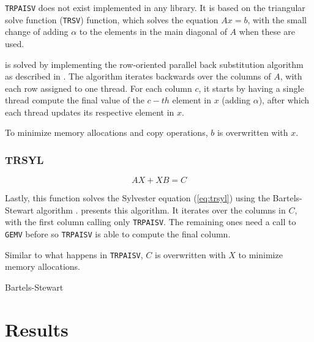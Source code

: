 \documentclass[../thesis]{subfiles}
\begin{document}
		\texttt{TRPAISV} does not exist implemented in any \blas library. It is based on the triangular solve function (\texttt{TRSV}) function, which solves the equation $Ax = b$, with the small change of adding $\alpha$ to the elements in the main diagonal of $A$ when these are used.

		 is solved by implementing the row-oriented parallel back substitution algorithm as described in \cite[293-295]{Quinn:PP:2003}. The algorithm iterates backwards over the columns of $A$, with each row assigned to one thread. For each column $c$, it starts by having a single thread compute the final value of the $c-th$ element in $x$ (adding $\alpha$), after which each thread updates its respective element in $x$.

		To minimize memory allocations and copy operations, $b$ is overwritten with $x$.

		\subsubsection{TRSYL}
		\begin{equation}
			AX + XB = C
			\label{eq:trsyl}
		\end{equation}

		Lastly, this function solves the Sylvester equation (\cref{eq:trsyl}) using the Bartels-Stewart algorithm \cite[367-368]{Golub:Loan:MC:1996}.  presents this algorithm. It iterates over the columns in $C$, with the first column calling only \texttt{TRPAISV}. The remaining ones need a call to \texttt{GEMV} before so \texttt{TRPAISV} is able to compute the final column.

		Similar to what happens in \texttt{TRPAISV}, $C$ is overwritten with $X$ to minimize memory allocations.

		\begin{algorithm}[htp]
			\caption{Bartels-Stewart}
			\label{alg:bartel_stewart}
			\DontPrintSemicolon



		\end{algorithm}

	\section{Results}
	
\end{document}
